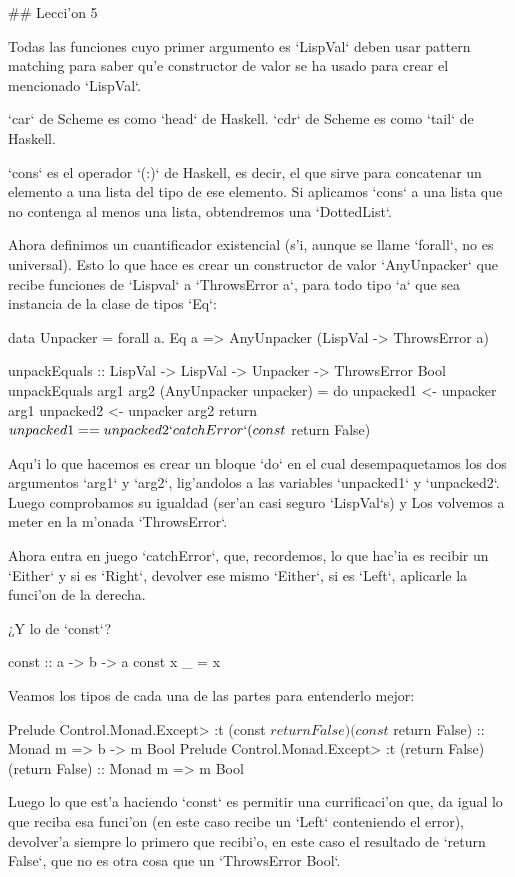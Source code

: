 ## Lecci'on 5

Todas las funciones cuyo primer argumento es `LispVal` deben usar pattern matching para saber qu'e constructor de valor se ha usado para crear el mencionado `LispVal`.

`car` de Scheme es como `head` de Haskell. `cdr` de Scheme es  como `tail` de Haskell.

`cons` es el operador `(:)` de Haskell, es decir, el que sirve para concatenar un elemento a una lista del tipo de ese elemento. Si aplicamos `cons` a una lista que no contenga al menos una lista, obtendremos una `DottedList`.

Ahora definimos un cuantificador existencial (s'i, aunque se llame `forall`, no es universal). Esto lo que hace es crear un constructor de valor `AnyUnpacker` que recibe funciones de `Lispval` a `ThrowsError a`, para todo tipo `a` que sea instancia de la clase de tipos `Eq`:

    data Unpacker = forall a. Eq a => AnyUnpacker (LispVal -> ThrowsError a)

    unpackEquals :: LispVal -> LispVal -> Unpacker -> ThrowsError Bool
    unpackEquals arg1 arg2 (AnyUnpacker unpacker) = 
                 do unpacked1 <- unpacker arg1
                    unpacked2 <- unpacker arg2
                    return $ unpacked1 == unpacked2
            `catchError` (const $ return False)

Aqu'i lo que hacemos es crear un bloque `do` en el cual desempaquetamos los dos argumentos `arg1` y `arg2`, lig'andolos a las variables `unpacked1` y `unpacked2`. Luego comprobamos su igualdad (ser'an casi seguro `LispVal`s) y Los volvemos a meter en la m'onada `ThrowsError`.

Ahora entra en juego `catchError`, que, recordemos, lo que hac'ia es recibir un `Either` y si es `Right`, devolver ese mismo `Either`, si es `Left`, aplicarle la funci'on de la derecha.

¿Y lo de `const`? 

    const            :: a -> b -> a
    const x _        =  x

Veamos los tipos de cada una de las partes para entenderlo mejor:

Prelude Control.Monad.Except> :t (const $ return False)
(const $ return False) :: Monad m => b -> m Bool
Prelude Control.Monad.Except> :t (return False)
(return False) :: Monad m => m Bool

Luego lo que est'a haciendo `const` es permitir una currificaci'on que, da igual lo que reciba esa funci'on (en este caso recibe un `Left` conteniendo el error), devolver'a siempre lo primero que recibi'o, en este caso el resultado de `return False`, que no es otra cosa que un `ThrowsError Bool`.

